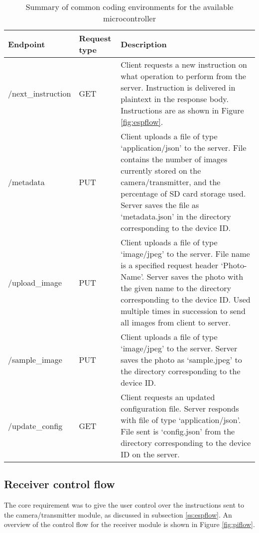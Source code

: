 \documentclass[class=report,11pt,crop=false]{standalone}
\begin{document}
\begin{table}[ht]
    \centering
    \begin{scriptsize}
    \begin{tabularx}{\textwidth}{|p{}|p{}|X|}
    \hline
    \textbf{Endpoint} & \textbf{Request type} & \textbf{Description} \\ \hline
    /next\_instruction & GET & Client requests a new instruction on what operation to perform from the server. Instruction is delivered in plaintext in the response body. Instructions are as shown in Figure \ref{fig:espflow}. \\ \hline
    /metadata & PUT & Client uploads a file of type `application/json' to the server. File contains the number of images currently stored on the camera/transmitter, and the percentage of SD card storage used. Server saves the file as `metadata.json' in the directory corresponding to the device ID. \\ \hline
    /upload\_image & PUT & Client uploads a file of type `image/jpeg' to the server. File name is a specified request header `Photo-Name'. Server saves the photo with the given name to the directory corresponding to the device ID. Used multiple times in succession to send all images from client to server. \\ \hline
    /sample\_image & PUT & Client uploads a file of type `image/jpeg' to the server. Server saves the photo as `sample.jpeg' to the directory corresponding to the device ID. \\ \hline
    /update\_config & GET & Client requests an updated configuration file. Server responds with file of type `application/json'. File sent is `config.json' from the directory corresponding to the device ID on the server. \\ \hline
    \end{tabularx}%
    \end{scriptsize}
    \caption{Summary of common coding environments for the available microcontroller}
    \label{tab:server-api}
\end{table}

\subsection{Receiver control flow}

 The core requirement was to give the user control over the instructions sent to the camera/transmitter module, as discussed in subsection \ref{ss:espflow}. An overview of the control flow for the receiver module is shown in Figure \ref{fig:piflow}.
\end{document}
